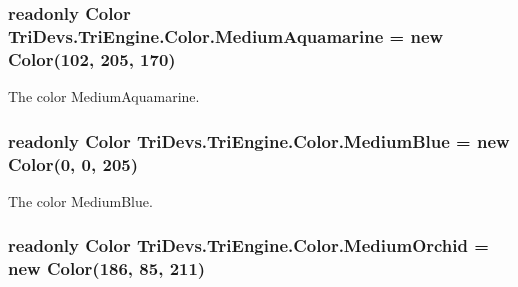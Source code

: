\hypertarget{struct_tri_devs_1_1_tri_engine_1_1_color_aeafaef273b17a33a242877239225d8fa}{
\subsubsection[{Medium\-Aquamarine}]{\setlength{\rightskip}{0pt plus 5cm}readonly {\bf Color} Tri\-Devs.\-Tri\-Engine.\-Color.\-Medium\-Aquamarine = new {\bf Color}(102, 205, 170)\hspace{0.3cm}{\ttfamily [static]}}}\label{struct_tri_devs_1_1_tri_engine_1_1_color_aeafaef273b17a33a242877239225d8fa}


The color Medium\-Aquamarine. 

\hypertarget{struct_tri_devs_1_1_tri_engine_1_1_color_ac599378ef86279725706801d862b538a}{
\subsubsection[{Medium\-Blue}]{\setlength{\rightskip}{0pt plus 5cm}readonly {\bf Color} Tri\-Devs.\-Tri\-Engine.\-Color.\-Medium\-Blue = new {\bf Color}(0, 0, 205)\hspace{0.3cm}{\ttfamily [static]}}}\label{struct_tri_devs_1_1_tri_engine_1_1_color_ac599378ef86279725706801d862b538a}


The color Medium\-Blue. 

\hypertarget{struct_tri_devs_1_1_tri_engine_1_1_color_a569acb5b22a6ef225a217cc2221750a1}{
\subsubsection[{Medium\-Orchid}]{\setlength{\rightskip}{0pt plus 5cm}readonly {\bf Color} Tri\-Devs.\-Tri\-Engine.\-Color.\-Medium\-Orchid = new {\bf Color}(186, 85, 211)\hspace{0.3cm}{\ttfamily [static]}}}\label{struct_tri_devs_1_1_tri_engine_1_1_color_a569acb5b22a6ef225a217cc2221750a1}


